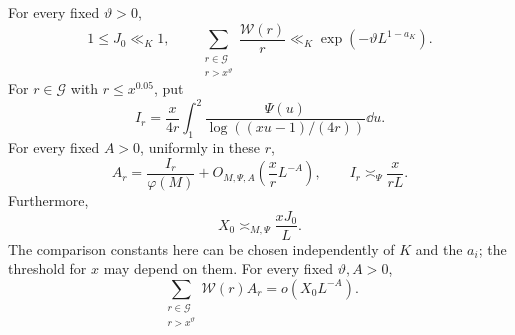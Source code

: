 \begin{lemma}\label{lem:marked-mass}
For every fixed \(\vartheta>0\),
\begin{equation}\label{eq:marked-harmonic-bounds}
 1\le J_0\ll_K1,\qquad
 \sum_{\substack{r\in\mathcal G\\r>x^\vartheta}}
       \frac{\mathcal W(r)}r
       \ll_K\exp(-\vartheta L^{1-a_K}).
\end{equation}
For \(r\in\mathcal G\) with \(r\le x^{0.05}\), put
\[
 I_r=\frac{x}{4r}\int_1^2
       \frac{\Psi(u)}{\log((xu-1)/(4r))}\dd u.
\]
For every fixed \(A>0\), uniformly in these \(r\),
\begin{equation}\label{eq:progression-pnt}
 A_r=\frac{I_r}{\varphi(M)}+O_{M,\Psi,A}\left(\frac xr L^{-A}\right),
 \qquad I_r\asymp_\Psi\frac{x}{rL}.
\end{equation}
Furthermore,
\begin{equation}\label{eq:marked-mass-comparability}
 X_0\asymp_{M,\Psi}\frac{xJ_0}{L}.
\end{equation}
The comparison constants here can be chosen independently of \(K\) and
the \(a_i\); the threshold for \(x\) may depend on them.  For every fixed
\(\vartheta,A>0\),
\begin{equation}\label{eq:marked-tail}
 \sum_{\substack{r\in\mathcal G\\r>x^\vartheta}}
       \mathcal W(r)A_r=o(X_0L^{-A}).
\end{equation}
\end{lemma}

